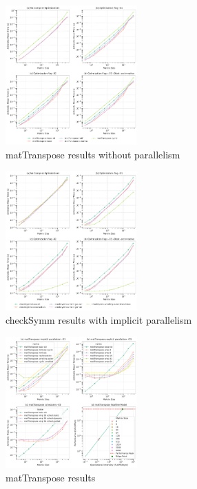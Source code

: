 \documentclass[conference]{IEEEtran}
\begin{document}
\begin{figure}[htb]
	\centering
	\includegraphics[width=0.45\textwidth]{"../benchmarks/plotting/images/transpose_base.pdf"}
	\caption{matTranspose results without parallelism}
	\label{fig:transpose_base}
\end{figure}
\begin{figure}[htb]
	
	\centering
	\includegraphics[width=0.45\textwidth]{"../benchmarks/plotting/images/symm_implicit.pdf"}
	\caption{checkSymm results with implicit parallelism}
	\label{fig:symm_implicit}
\end{figure}

\begin{figure}[htb]
	\centering
	\includegraphics[width=0.45\textwidth]{"../benchmarks/plotting/images/transpose_all.pdf"}
	\caption{matTranspose results}
	\label{fig:transpose_benchmarks}
\end{figure}
\end{document}
